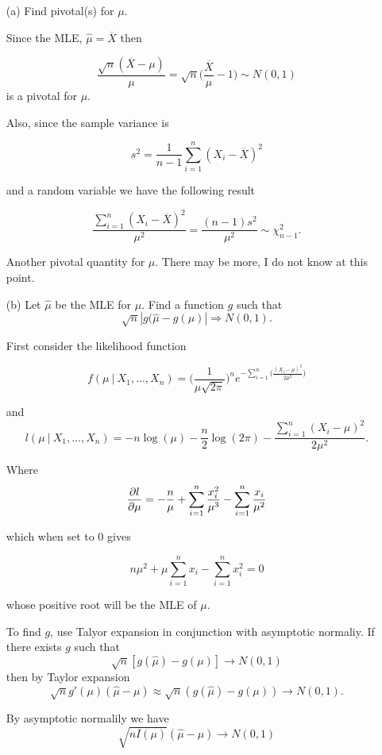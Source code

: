 \documentclass{tufte-book}
\begin{document}
\begin{enumerate}

\item[(a)] Find pivotal(s) for $\mu$.

Since the MLE, $\hat{\mu}=\overline{X}$ then

\[ \frac{\sqrt{n}(\overline{X} - \mu)}{\mu} = \sqrt{n}\Big(\frac{\overline{X}}{\mu} - 1\Big) \sim N(0,1) \]
is a pivotal for $\mu$.

Also, since the sample variance is

\[ s^2 = \frac{1}{n-1} \sum_{i=1}^n(X_i - \overline{X})^2 \]

and a random variable we have the following result

\[ \frac{\sum_{i=1}^n(X_i -\overline{X})^2}{\mu^2} = \frac{(n-1)s^2}{\mu^2} \sim \chi_{n-1}^2. \]

Another pivotal quantity for $\mu$.  There may be more, I do not know at this point.

\item[(b)] Let $\hat{\mu}$ be the MLE for $\mu$.  Find a function $g$ such that \[ \sqrt{n}|g(\hat{\mu}-g(\mu)| \Rightarrow N(0,1). \]

First consider the likelihood function

\[ f(\mu \ | \ X_1,...,X_n) = \Big(\frac{1}{\mu\sqrt{2\pi}}\Big)^n e^{-\sum_{i=1}^n\Big(\frac{(X_i-\mu)^2}{2\mu^2}\Big)} \]

and
\[ l(\mu \ | \ X_1,...,X_n) = -n \log(\mu) - \frac{n}{2}\log(2\pi) - \frac{\sum_{i=1}^n(X_i-\mu)^2}{2\mu^2}. \]

Where
\[ \frac{\partial l}{\partial \mu} = -\frac{n}{\mu} + \sum_{i=1}^n\frac{x_i^2}{\mu^3} - \sum_{i=1}^n\frac{x_i}{\mu^2} \]

which when set to $0$ gives

\[ n\mu^2 + \mu\sum_{i=1}^n x_i -\sum_{i=1}^n x_i^2 = 0 \]

whose positive root will be the MLE of $\mu$.

To find $g$, use Talyor expansion in conjunction with asymptotic normaliy.  If there exists $g$ such that
\[ \sqrt{n}[g(\hat{\mu})-g(\mu)] \rightarrow N(0,1) \]
then by Taylor expansion
\begin{equation} \sqrt{n}g'(\mu)(\hat{\mu}-\mu) \approx \sqrt{n}(g(\hat{\mu})-g(\mu)) \rightarrow N(0,1).
\end{equation}

By asymptotic normalily we have
\begin{equation}
\sqrt{nI(\mu)}(\hat{\mu} - \mu) \rightarrow N(0,1)
\end{equation}


\end{enumerate}
\end{document}
